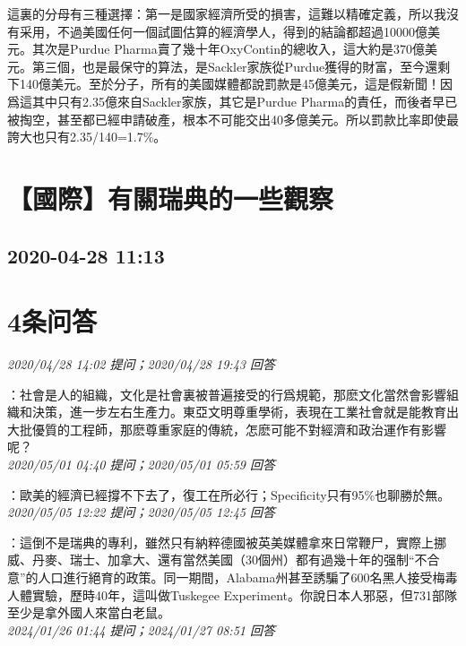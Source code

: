\documentclass[twocolumn]{ctexart}
\begin{document}
這裏的分母有三種選擇：第一是國家經濟所受的損害，這難以精確定義，所以我沒有采用，不過美國任何一個試圖估算的經濟學人，得到的結論都超過10000億美元。其次是Purdue Pharma賣了幾十年OxyContin的總收入，這大約是370億美元。第三個，也是最保守的算法，是Sackler家族從Purdue獲得的財富，至今還剩下140億美元。至於分子，所有的美國媒體都說罰款是45億美元，這是假新聞！因爲這其中只有2.35億來自Sackler家族，其它是Purdue Pharma的責任，而後者早已被掏空，甚至都已經申請破產，根本不可能交出40多億美元。所以罰款比率即使最誇大也只有2.35/140=1.7\%。
\\


\section{【國際】有關瑞典的一些觀察}
\subsection{2020-04-28 11:13}


\section{4条问答}

\textit{\hfill\noindent\small 2020/04/28 14:02 提问；2020/04/28 19:43 回答}

：社會是人的組織，文化是社會裏被普遍接受的行爲規範，那麽文化當然會影響組織和決策，進一步左右生產力。東亞文明尊重學術，表現在工業社會就是能教育出大批優質的工程師，那麽尊重家庭的傳統，怎麽可能不對經濟和政治運作有影響呢？
\\

\textit{\hfill\noindent\small 2020/05/01 04:40 提问；2020/05/01 05:59 回答}

：歐美的經濟已經撐不下去了，復工在所必行；Specificity只有95\%也聊勝於無。
\\

\textit{\hfill\noindent\small 2020/05/05 12:22 提问；2020/05/05 12:45 回答}

：這倒不是瑞典的專利，雖然只有納粹德國被英美媒體拿來日常鞭尸，實際上挪威、丹麥、瑞士、加拿大、還有當然美國（30個州）都有過幾十年的强制“不合意”的人口進行絕育的政策。同一期間，Alabama州甚至誘騙了600名黑人接受梅毒人體實驗，歷時40年，這叫做Tuskegee Experiment。你說日本人邪惡，但731部隊至少是拿外國人來當白老鼠。
\\

\textit{\hfill\noindent\small 2024/01/26 01:44 提问；2024/01/27 08:51 回答}
\end{document}
